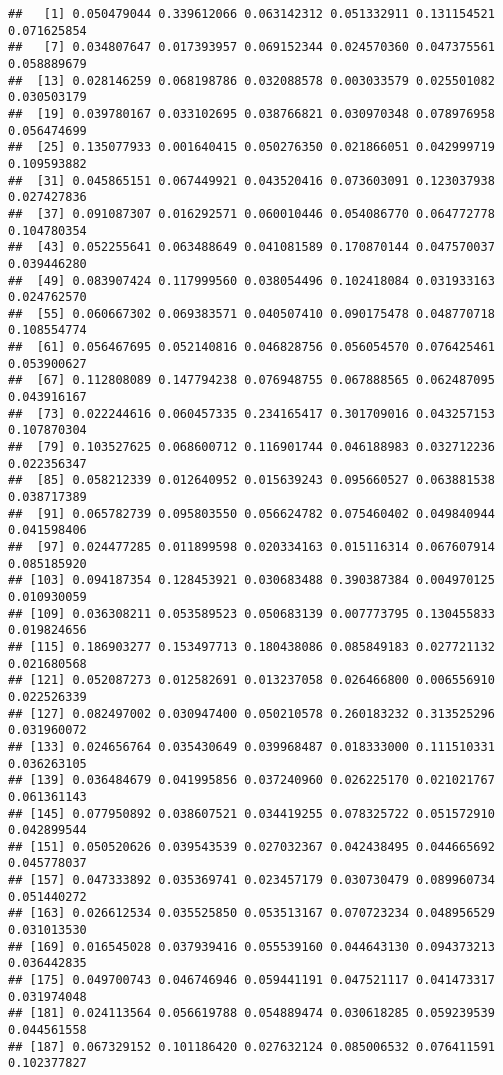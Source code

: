 \documentclass[
]{article}
\begin{document}
\begin{verbatim}
##   [1] 0.050479044 0.339612066 0.063142312 0.051332911 0.131154521 0.071625854
##   [7] 0.034807647 0.017393957 0.069152344 0.024570360 0.047375561 0.058889679
##  [13] 0.028146259 0.068198786 0.032088578 0.003033579 0.025501082 0.030503179
##  [19] 0.039780167 0.033102695 0.038766821 0.030970348 0.078976958 0.056474699
##  [25] 0.135077933 0.001640415 0.050276350 0.021866051 0.042999719 0.109593882
##  [31] 0.045865151 0.067449921 0.043520416 0.073603091 0.123037938 0.027427836
##  [37] 0.091087307 0.016292571 0.060010446 0.054086770 0.064772778 0.104780354
##  [43] 0.052255641 0.063488649 0.041081589 0.170870144 0.047570037 0.039446280
##  [49] 0.083907424 0.117999560 0.038054496 0.102418084 0.031933163 0.024762570
##  [55] 0.060667302 0.069383571 0.040507410 0.090175478 0.048770718 0.108554774
##  [61] 0.056467695 0.052140816 0.046828756 0.056054570 0.076425461 0.053900627
##  [67] 0.112808089 0.147794238 0.076948755 0.067888565 0.062487095 0.043916167
##  [73] 0.022244616 0.060457335 0.234165417 0.301709016 0.043257153 0.107870304
##  [79] 0.103527625 0.068600712 0.116901744 0.046188983 0.032712236 0.022356347
##  [85] 0.058212339 0.012640952 0.015639243 0.095660527 0.063881538 0.038717389
##  [91] 0.065782739 0.095803550 0.056624782 0.075460402 0.049840944 0.041598406
##  [97] 0.024477285 0.011899598 0.020334163 0.015116314 0.067607914 0.085185920
## [103] 0.094187354 0.128453921 0.030683488 0.390387384 0.004970125 0.010930059
## [109] 0.036308211 0.053589523 0.050683139 0.007773795 0.130455833 0.019824656
## [115] 0.186903277 0.153497713 0.180438086 0.085849183 0.027721132 0.021680568
## [121] 0.052087273 0.012582691 0.013237058 0.026466800 0.006556910 0.022526339
## [127] 0.082497002 0.030947400 0.050210578 0.260183232 0.313525296 0.031960072
## [133] 0.024656764 0.035430649 0.039968487 0.018333000 0.111510331 0.036263105
## [139] 0.036484679 0.041995856 0.037240960 0.026225170 0.021021767 0.061361143
## [145] 0.077950892 0.038607521 0.034419255 0.078325722 0.051572910 0.042899544
## [151] 0.050520626 0.039543539 0.027032367 0.042438495 0.044665692 0.045778037
## [157] 0.047333892 0.035369741 0.023457179 0.030730479 0.089960734 0.051440272
## [163] 0.026612534 0.035525850 0.053513167 0.070723234 0.048956529 0.031013530
## [169] 0.016545028 0.037939416 0.055539160 0.044643130 0.094373213 0.036442835
## [175] 0.049700743 0.046746946 0.059441191 0.047521117 0.041473317 0.031974048
## [181] 0.024113564 0.056619788 0.054889474 0.030618285 0.059239539 0.044561558
## [187] 0.067329152 0.101186420 0.027632124 0.085006532 0.076411591 0.102377827

\end{verbatim}
\end{document}
